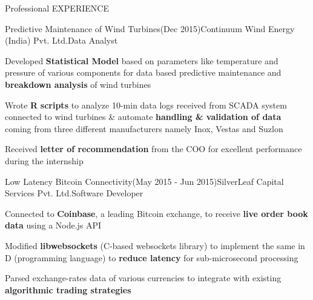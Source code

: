 \documentclass{resume} %
\begin{document}
\begin{rSection}{Professional EXPERIENCE}

\begin{rSubsection}{Predictive Maintenance of Wind Turbines}{(Dec 2015)}{Continuum Wind Energy (India) Pvt. Ltd.}{Data Analyst \hspace{0.2 cm}}
\item Developed \textbf{Statistical Model} based on parameters like temperature and pressure of various components for data based predictive maintenance and \textbf{breakdown analysis} of wind turbines
\item Wrote \textbf{R} \textbf{scripts} to analyze 10-min data logs received from SCADA system connected to wind turbines \& automate \textbf{handling \& validation of data} coming from three different manufacturers namely Inox, Vestas and Suzlon
\item Received \textbf{letter of recommendation} from the COO for excellent performance during the internship
\end{rSubsection}

\vspace{-0.2em}

\begin{rSubsection}{Low Latency Bitcoin Connectivity}{(May 2015 - Jun 2015)}{SilverLeaf Capital Services Pvt. Ltd.}{Software Developer \hspace{0.2 cm}}
\item Connected to \textbf{Coinbase}, a leading Bitcoin exchange, to receive \textbf{live order book data} using a Node.js API
\item Modified \textbf{libwebsockets} (C-based websockets library) to implement the same in D (programming language) to \textbf{reduce latency} for sub-microsecond processing
\item Parsed exchange-rates data of various currencies to integrate with existing \textbf{algorithmic trading strategies} 
\end{rSubsection}

\end{rSection} 


\end{document}
